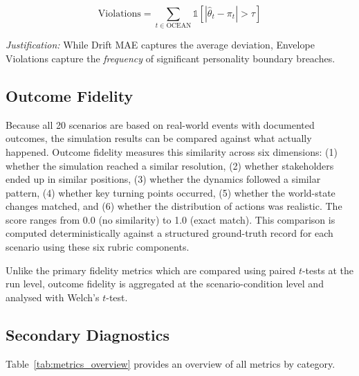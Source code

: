 \documentclass[12pt, a4paper]{report}
\begin{document}
\begin{equation}
    \text{Violations} = \sum_{t \in \text{OCEAN}} \mathbb{1}\!\left[|\hat{\theta}_t - \pi_t| > \tau\right]
    \label{eq:envelope}
\end{equation}

\textit{Justification:} While Drift MAE captures the average deviation, Envelope Violations capture the \textit{frequency} of significant personality boundary breaches.


\subsection{Outcome Fidelity}

Because all 20 scenarios are based on real-world events with documented outcomes, the simulation results can be compared against what actually happened. Outcome fidelity measures this similarity across six dimensions: (1) whether the simulation reached a similar resolution, (2) whether stakeholders ended up in similar positions, (3) whether the dynamics followed a similar pattern, (4) whether key turning points occurred, (5) whether the world-state changes matched, and (6) whether the distribution of actions was realistic. The score ranges from 0.0 (no similarity) to 1.0 (exact match). This comparison is computed deterministically against a structured ground-truth record for each scenario using these six rubric components.

Unlike the primary fidelity metrics which are compared using paired $t$-tests at the run level, outcome fidelity is aggregated at the scenario-condition level and analysed with Welch's $t$-test.


\subsection{Secondary Diagnostics}

Table~\ref{tab:metrics_overview} provides an overview of all metrics by category.
\end{document}
